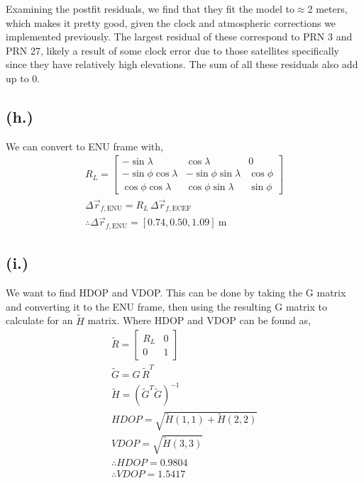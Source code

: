 \documentclass[11pt]{article}
\begin{document}
\hspace*{2em}Examining the postfit residuals, we find that they fit the model to$\approx$2 meters, which makes it pretty good, given the clock and atmospheric corrections we implemented previously. The largest residual of these correspond to PRN 3 and PRN 27, likely a result of some clock error due to those satellites specifically since they have relatively high elevations. The sum of all these residuals also add up to 0.

\subsection*{(h.)}
\hspace*{2em}We can convert to ENU frame with,
\begin{gather*}
R_L = \begin{bmatrix} -\sin\lambda & \cos\lambda & 0 \\ -\sin\phi\cos\lambda & -\sin\phi\sin\lambda & \cos\phi \\ \cos\phi\cos\lambda & \cos\phi\sin\lambda & \sin\phi \end{bmatrix} \\
\Delta\vec{r}_{f,\mathrm{ENU}} = R_L\,\Delta\vec{r}_{f,\mathrm{ECEF}} \\
\therefore \boxed{\Delta\vec{r}_{f,\mathrm{ENU}} = [0.74, 0.50, 1.09]~\mathrm{m}}
\end{gather*}

\subsection*{(i.)}
\hspace*{2em}We want to find HDOP and VDOP. This can be done by taking the G matrix and converting it to the ENU frame, then using the resulting G matrix to calculate for an $\tilde{H}$ matrix. Where HDOP and VDOP can be found as,
\begin{gather*}
\tilde{R} = \begin{bmatrix} R_L & 0 \\ 0 & 1 \end{bmatrix} \\
\tilde{G} = G\,\tilde{R}^{T} \\
\tilde{H} = \left(\tilde{G}^{T}\tilde{G}\right)^{-1}\\
HDOP = \sqrt{\tilde{H}(1,1) + \tilde{H}(2,2)} \\
VDOP = \sqrt{\tilde{H}(3,3)}
\\
\therefore \boxed{HDOP = 0.9804} \\
\therefore \boxed{VDOP = 1.5417}
\end{gather*}
\end{document}
